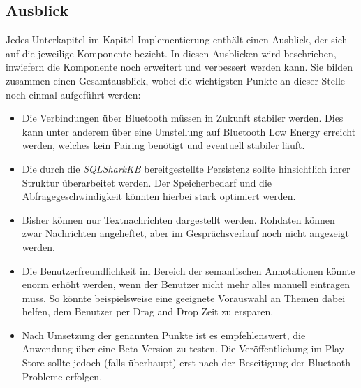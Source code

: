 \subsection{Ausblick}
Jedes Unterkapitel im Kapitel Implementierung enthält einen Ausblick, der sich auf die jeweilige Komponente bezieht. In diesen Ausblicken wird beschrieben, inwiefern die Komponente noch erweitert und verbessert werden kann. Sie bilden zusammen einen Gesamtausblick, wobei die wichtigsten Punkte an dieser Stelle noch einmal aufgeführt werden:
\begin{itemize}
	\item Die Verbindungen über Bluetooth müssen in Zukunft stabiler werden. Dies kann unter anderem über eine Umstellung auf Bluetooth Low Energy erreicht werden, welches kein Pairing benötigt und eventuell stabiler läuft.
	\item Die durch die \textit{SQLSharkKB} bereitgestellte Persistenz sollte hinsichtlich ihrer Struktur überarbeitet werden. Der Speicherbedarf und die Abfragegeschwindigkeit könnten hierbei stark optimiert werden.
	\item Bisher können nur Textnachrichten dargestellt werden. Rohdaten können zwar Nachrichten angeheftet, aber im Gesprächsverlauf noch nicht angezeigt werden.
	\item Die Benutzerfreundlichkeit im Bereich der semantischen Annotationen könnte enorm erhöht werden, wenn der Benutzer nicht mehr alles manuell eintragen muss. So könnte beispielsweise eine geeignete Vorauswahl an Themen dabei helfen, dem Benutzer per Drag and Drop Zeit zu ersparen.
	\item Nach Umsetzung der genannten Punkte ist es empfehlenswert, die Anwendung über eine Beta-Version zu testen. Die Veröffentlichung im Play-Store sollte jedoch (falls überhaupt) erst nach der Beseitigung der Bluetooth-Probleme erfolgen. 
\end{itemize}


 